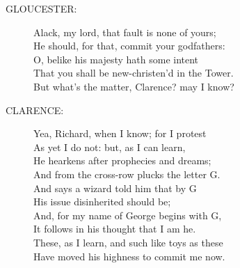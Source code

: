 \documentclass{article}
\begin{document}
\begin{description}
\item[GLOUCESTER:] 
\hspace{1pt}Alack, my lord, that fault is none of yours;\\
\hspace{1pt}He should, for that, commit your godfathers:\\
\hspace{1pt}O, belike his majesty hath some intent\\
\hspace{1pt}That you shall be new-christen'd in the Tower.\\
\hspace{1pt}But what's the matter, Clarence?  may I know?\\
\end{description}
\begin{description}
\item[CLARENCE:] 
\hspace{1pt}Yea, Richard, when I know; for I protest\\
\hspace{1pt}As yet I do not: but, as I can learn,\\
\hspace{1pt}He hearkens after prophecies and dreams;\\
\hspace{1pt}And from the cross-row plucks the letter G.\\
\hspace{1pt}And says a wizard told him that by G\\
\hspace{1pt}His issue disinherited should be;\\
\hspace{1pt}And, for my name of George begins with G,\\
\hspace{1pt}It follows in his thought that I am he.\\
\hspace{1pt}These, as I learn, and such like toys as these\\
\hspace{1pt}Have moved his highness to commit me now.\\
\end{description}
\end{document}
